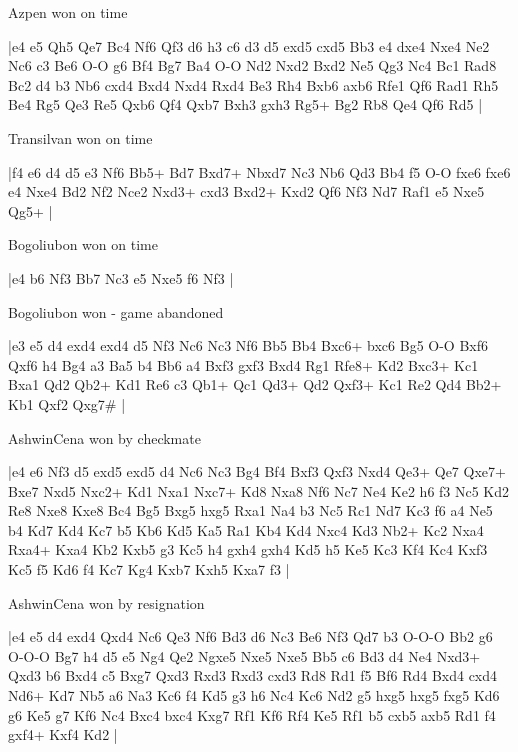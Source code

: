 \showboard

Azpen won on time

\makegametitle
|e4 e5 Qh5 Qe7 Bc4 Nf6 Qf3 d6 h3 c6 d3 d5 exd5 cxd5 Bb3 e4 dxe4 Nxe4 Ne2 Nc6 c3 Be6 O-O g6 Bf4 Bg7 Ba4 O-O Nd2 Nxd2 Bxd2 Ne5 Qg3 Nc4 Bc1 Rad8 Bc2 d4 b3 Nb6 cxd4 Bxd4 Nxd4 Rxd4 Be3 Rh4 Bxb6 axb6 Rfe1 Qf6 Rad1 Rh5 Be4 Rg5 Qe3 Re5 Qxb6 Qf4 Qxb7 Bxh3 gxh3 Rg5+ Bg2 Rb8 Qe4 Qf6 Rd5  |

\showboard

Transilvan won on time

\makegametitle
|f4 e6 d4 d5 e3 Nf6 Bb5+ Bd7 Bxd7+ Nbxd7 Nc3 Nb6 Qd3 Bb4 f5 O-O fxe6 fxe6 e4 Nxe4 Bd2 Nf2 Nce2 Nxd3+ cxd3 Bxd2+ Kxd2 Qf6 Nf3 Nd7 Raf1 e5 Nxe5 Qg5+  |

\showboard

Bogoliubon won on time

\makegametitle
|e4 b6 Nf3 Bb7 Nc3 e5 Nxe5 f6 Nf3  |

\showboard

Bogoliubon won - game abandoned

\makegametitle
|e3 e5 d4 exd4 exd4 d5 Nf3 Nc6 Nc3 Nf6 Bb5 Bb4 Bxc6+ bxc6 Bg5 O-O Bxf6 Qxf6 h4 Bg4 a3 Ba5 b4 Bb6 a4 Bxf3 gxf3 Bxd4 Rg1 Rfe8+ Kd2 Bxc3+ Kc1 Bxa1 Qd2 Qb2+ Kd1 Re6 c3 Qb1+ Qc1 Qd3+ Qd2 Qxf3+ Kc1 Re2 Qd4 Bb2+ Kb1 Qxf2 Qxg7\#  |

\showboard

AshwinCena won by checkmate

\makegametitle
|e4 e6 Nf3 d5 exd5 exd5 d4 Nc6 Nc3 Bg4 Bf4 Bxf3 Qxf3 Nxd4 Qe3+ Qe7 Qxe7+ Bxe7 Nxd5 Nxc2+ Kd1 Nxa1 Nxc7+ Kd8 Nxa8 Nf6 Nc7 Ne4 Ke2 h6 f3 Nc5 Kd2 Re8 Nxe8 Kxe8 Bc4 Bg5 Bxg5 hxg5 Rxa1 Na4 b3 Nc5 Rc1 Nd7 Kc3 f6 a4 Ne5 b4 Kd7 Kd4 Kc7 b5 Kb6 Kd5 Ka5 Ra1 Kb4 Kd4 Nxc4 Kd3 Nb2+ Kc2 Nxa4 Rxa4+ Kxa4 Kb2 Kxb5 g3 Kc5 h4 gxh4 gxh4 Kd5 h5 Ke5 Kc3 Kf4 Kc4 Kxf3 Kc5 f5 Kd6 f4 Kc7 Kg4 Kxb7 Kxh5 Kxa7 f3  |

\showboard

AshwinCena won by resignation

\makegametitle
|e4 e5 d4 exd4 Qxd4 Nc6 Qe3 Nf6 Bd3 d6 Nc3 Be6 Nf3 Qd7 b3 O-O-O Bb2 g6 O-O-O Bg7 h4 d5 e5 Ng4 Qe2 Ngxe5 Nxe5 Nxe5 Bb5 c6 Bd3 d4 Ne4 Nxd3+ Qxd3 b6 Bxd4 c5 Bxg7 Qxd3 Rxd3 Rxd3 cxd3 Rd8 Rd1 f5 Bf6 Rd4 Bxd4 cxd4 Nd6+ Kd7 Nb5 a6 Na3 Kc6 f4 Kd5 g3 h6 Nc4 Kc6 Nd2 g5 hxg5 hxg5 fxg5 Kd6 g6 Ke5 g7 Kf6 Nc4 Bxc4 bxc4 Kxg7 Rf1 Kf6 Rf4 Ke5 Rf1 b5 cxb5 axb5 Rd1 f4 gxf4+ Kxf4 Kd2  |


